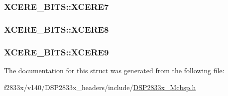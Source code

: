 \subsubsection[{X\+C\+E\+R\+E7}]{ X\+C\+E\+R\+E\+\_\+\+B\+I\+T\+S\+::\+X\+C\+E\+R\+E7}\label{struct_x_c_e_r_e___b_i_t_s_ab8b8ab12dc15f37e4404149ca3b9e4da}
\hypertarget{struct_x_c_e_r_e___b_i_t_s_a3cbb5e42759c4c55277fa6895df4cc59}{}
\subsubsection[{X\+C\+E\+R\+E8}]{ X\+C\+E\+R\+E\+\_\+\+B\+I\+T\+S\+::\+X\+C\+E\+R\+E8}\label{struct_x_c_e_r_e___b_i_t_s_a3cbb5e42759c4c55277fa6895df4cc59}
\hypertarget{struct_x_c_e_r_e___b_i_t_s_af836ac77351100499a7698d4d64f56b5}{}
\subsubsection[{X\+C\+E\+R\+E9}]{ X\+C\+E\+R\+E\+\_\+\+B\+I\+T\+S\+::\+X\+C\+E\+R\+E9}\label{struct_x_c_e_r_e___b_i_t_s_af836ac77351100499a7698d4d64f56b5}


The documentation for this struct was generated from the following file\+:\begin{DoxyCompactItemize}
\item 
f2833x/v140/\+D\+S\+P2833x\+\_\+headers/include/\hyperlink{_d_s_p2833x___mcbsp_8h}{D\+S\+P2833x\+\_\+\+Mcbsp.\+h}\end{DoxyCompactItemize}
